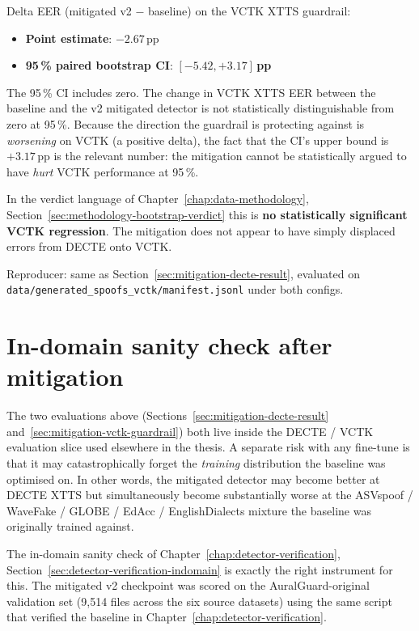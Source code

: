 Delta EER (mitigated v2 $-$ baseline) on the VCTK XTTS guardrail:

\begin{itemize}
    \item \textbf{Point estimate}: $-2.67$\,pp
    \item \textbf{95\,\% paired bootstrap CI}: $\mathbf{[-5.42, +3.17]}$\,\textbf{pp}
\end{itemize}

The 95\,\% CI includes zero. The change in VCTK XTTS EER between
the baseline and the v2 mitigated detector is not statistically
distinguishable from zero at 95\,\%. Because the direction the
guardrail is protecting against is \emph{worsening} on VCTK (a
positive delta), the fact that the CI's upper bound is $+3.17$\,pp
is the relevant number: the mitigation cannot be statistically
argued to have \emph{hurt} VCTK performance at 95\,\%.

In the verdict language of Chapter~\ref{chap:data-methodology}, Section~\ref{sec:methodology-bootstrap-verdict} this is
\textbf{no statistically significant VCTK regression}. The mitigation
does not appear to have simply displaced errors from DECTE onto
VCTK.

Reproducer: same as Section~\ref{sec:mitigation-decte-result}, evaluated on
\texttt{data/}\allowbreak\texttt{generated\_spoofs\_vctk/}\allowbreak\texttt{manifest.jsonl} under both configs.


\section{In-domain sanity check after mitigation}
\label{sec:mitigation-indomain-sanity}

The two evaluations above (Sections~\ref{sec:mitigation-decte-result} and~\ref{sec:mitigation-vctk-guardrail}) both live inside
the DECTE / VCTK evaluation slice used elsewhere in the thesis.
A separate risk with any fine-tune is that it may catastrophically
forget the \emph{training} distribution the baseline was optimised
on. In other words, the mitigated detector may become better at
DECTE XTTS but simultaneously become substantially worse at the
ASVspoof / WaveFake / GLOBE / EdAcc / EnglishDialects mixture
the baseline was originally trained against.

The in-domain sanity check of Chapter~\ref{chap:detector-verification}, Section~\ref{sec:detector-verification-indomain} is exactly
the right instrument for this. The mitigated v2 checkpoint was
scored on the AuralGuard-original validation set (9,514 files
across the six source datasets) using the same script that
verified the baseline in Chapter~\ref{chap:detector-verification}.

